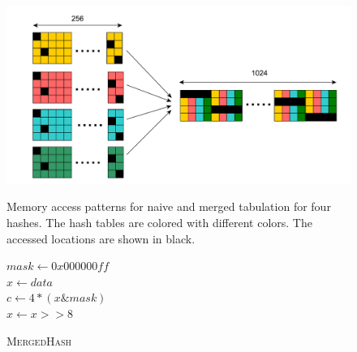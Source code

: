 \documentclass[runningheads]{llncs}
\begin{document}
\vspace{-8.5mm}
 \begin{figure}[H]
\begin{minipage}[c]{0.5\textwidth}
\includegraphics[width=\textwidth]{merged_tabular_access.pdf}
\caption{\small{Memory access patterns for naive and merged tabulation for four hashes. The hash tables are colored with different colors. The accessed locations are shown in black.}}
\label{fig:merged_tabular_access}
  \end{minipage}\hfill\hfill\hfill
 \begin{minipage}[c]{0.45\textwidth}
\renewcommand{\baselinestretch}{0.9}
 \begin{algorithm}[H]
  	\smaller
  	\caption{\textsc{MergedHash}}  
  	\SetAlgoNoLine
	 	$mask \leftarrow 0x000000ff$ \\
		$x \leftarrow data$ \\
		$c \leftarrow 4*(x \& mask)$ \\
	$x \leftarrow x>>8$ \\
\label{algo:tabhash} 	
\end{algorithm}
\renewcommand{\baselinestretch}{1}
  \end{minipage}
\end{figure}
\end{document}

